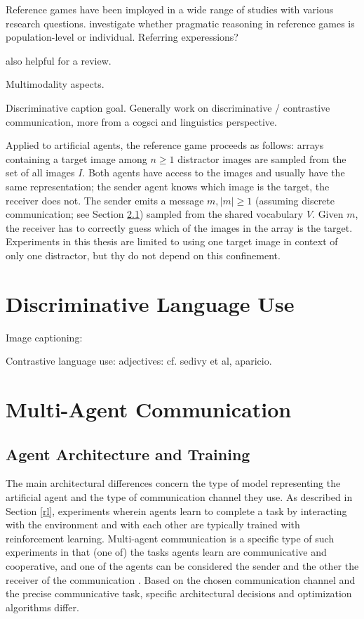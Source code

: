 Reference games have been imployed in a wide range of studies with various research questions. \cite{franke2016reasoning} investigate whether pragmatic reasoning in reference games is population-level or individual. Referring experessions?

\cite{lazaridou2018emergence} also helpful for a review.

Multimodality aspects.

Discriminative caption goal. Generally work on discriminative / contrastive communication, more from a cogsci and linguistics perspective.

Applied to artificial agents, the reference game proceeds as follows: arrays containing a target image among $n \geq 1$ distractor images are sampled from the set of all images $I$. Both agents have access to the images and usually have the same representation; the sender agent knows which image is the target, the receiver does not. The sender emits a message $m, |m| \geq 1$ (assuming discrete communication; see Section \ref{multi_agent_arch}) sampled from the shared vocabulary $V$. Given $m$, the receiver has to correctly guess which of the images in the array is the target. Experiments in this thesis are limited to using one target image in context of only one distractor, but thy do not depend on this confinement.

\section{Discriminative Language Use}

Image captioning: 

Contrastive language use: adjectives: cf. sedivy et al, aparicio. 

\section{Multi-Agent Communication}
\subsection{Agent Architecture and Training}
\label{multi_agent_arch}
The main architectural differences concern the type of model representing the artificial agent and the type of communication channel they use.
As described in Section \ref{rl}, experiments wherein agents learn to complete a task by interacting with the environment and with each other are typically trained with reinforcement learning. Multi-agent communication is a specific type of such experiments in that (one of) the tasks agents learn are communicative and cooperative, and one of the agents can be considered the sender and the other the receiver of the communication \parencite[cf.][]{tan1993multi, lazaridou2016multi}.
Based on the chosen communication channel and the precise communicative task, specific architectural decisions and optimization algorithms differ. 

